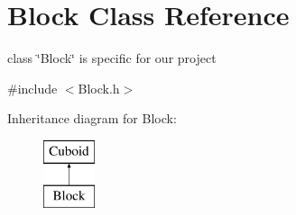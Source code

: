 \hypertarget{classBlock}{\section{\-Block \-Class \-Reference}
\label{classBlock}
}


class \char`\"{}\-Block\char`\"{} is specific for our project  




{\ttfamily \#include $<$\-Block.\-h$>$}

\-Inheritance diagram for \-Block\-:\begin{figure}[H]
\begin{center}
\leavevmode
\includegraphics[height=2.000000cm]{classBlock}
\end{center}
\end{figure}
